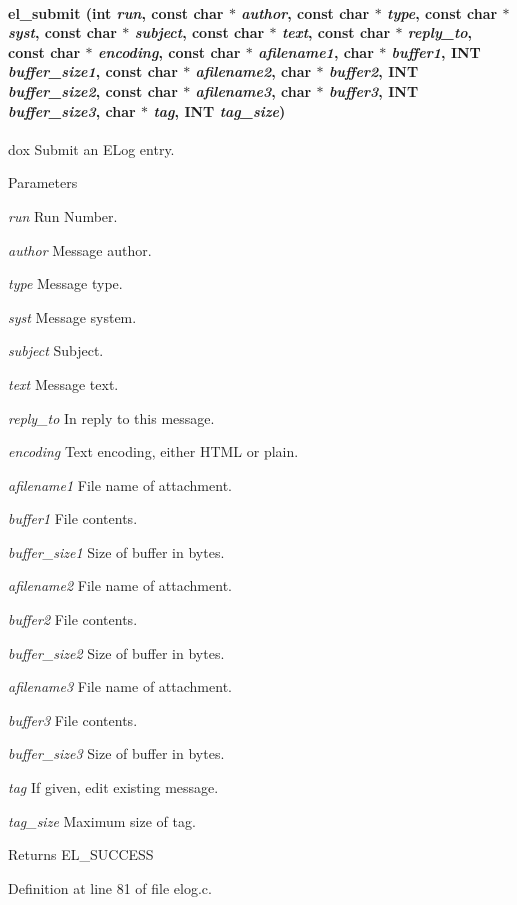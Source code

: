 \paragraph[{el\_\-submit}]{ el\_\-submit (int {\em run}, \/  const char $\ast$ {\em author}, \/  const char $\ast$ {\em type}, \/  const char $\ast$ {\em syst}, \/  const char $\ast$ {\em subject}, \/  const char $\ast$ {\em text}, \/  const char $\ast$ {\em reply\_\-to}, \/  const char $\ast$ {\em encoding}, \/  const char $\ast$ {\em afilename1}, \/  char $\ast$ {\em buffer1}, \/  {\bf INT} {\em buffer\_\-size1}, \/  const char $\ast$ {\em afilename2}, \/  char $\ast$ {\em buffer2}, \/  {\bf INT} {\em buffer\_\-size2}, \/  const char $\ast$ {\em afilename3}, \/  char $\ast$ {\em buffer3}, \/  {\bf INT} {\em buffer\_\-size3}, \/  char $\ast$ {\em tag}, \/  {\bf INT} {\em tag\_\-size})}\hfill\label{group__elfunctioncode_gae698a2d388573565a5673afbd3b40f9b}
dox Submit an ELog entry. 
\begin{DoxyParams}{Parameters}
\item[{\em run}]Run Number. \item[{\em author}]Message author. \item[{\em type}]Message type. \item[{\em syst}]Message system. \item[{\em subject}]Subject. \item[{\em text}]Message text. \item[{\em reply\_\-to}]In reply to this message. \item[{\em encoding}]Text encoding, either HTML or plain. \item[{\em afilename1}]File name of attachment. \item[{\em buffer1}]File contents. \item[{\em buffer\_\-size1}]Size of buffer in bytes. \item[{\em afilename2}]File name of attachment. \item[{\em buffer2}]File contents. \item[{\em buffer\_\-size2}]Size of buffer in bytes. \item[{\em afilename3}]File name of attachment. \item[{\em buffer3}]File contents. \item[{\em buffer\_\-size3}]Size of buffer in bytes. \item[{\em tag}]If given, edit existing message. \item[{\em tag\_\-size}]Maximum size of tag. \end{DoxyParams}
\begin{DoxyReturn}{Returns}
EL\_\-SUCCESS 
\end{DoxyReturn}


Definition at line 81 of file elog.c.